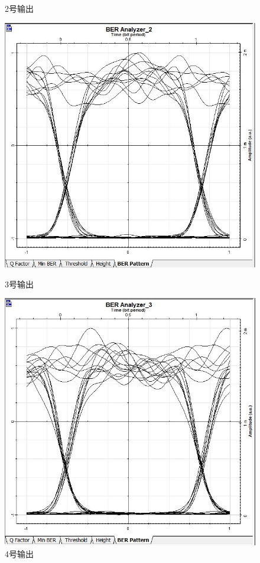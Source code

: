 \documentclass[12pt, a4paper, oneside]{article}
\begin{document}
\begin{spacing}{2.0}
\begin{figure}[H]
\begin{minipage}[t]{0.5\linewidth}
      \caption{2号输出}
      \label{fig:side:b}
    \end{minipage}
  \begin{minipage}[t]{0.5\linewidth}
      \centering
      \includegraphics[scale=0.5]{3-BER.jpg}
      \caption{3号输出}
      \label{fig:side:a}
    \end{minipage}%
    \begin{minipage}[t]{0.5\linewidth}
      \centering
      \includegraphics[scale=0.5]{4-BER.jpg}
      \caption{4号输出}
      \label{fig:side:b}
    \end{minipage}
\end{figure}



\end{spacing}
\end{document}

